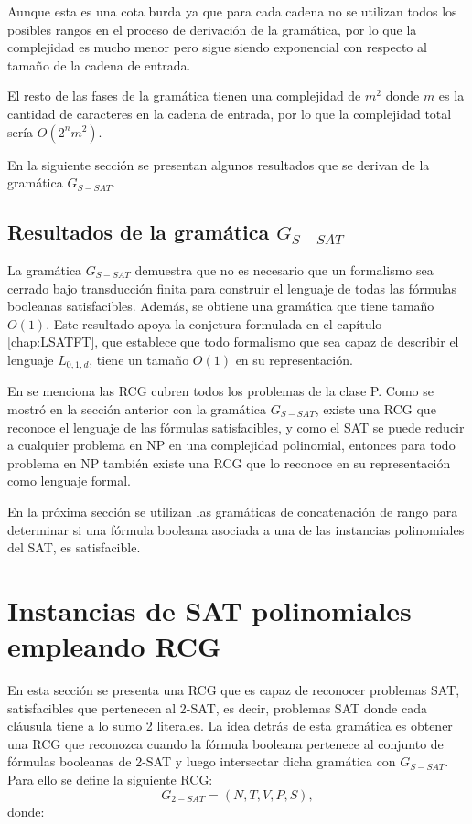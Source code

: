 \documentclass[12pt]{article}
\begin{document}
Aunque esta es una cota burda ya que para cada cadena no se utilizan todos los posibles rangos en el proceso 
de derivación de la gramática, por lo que la complejidad es mucho menor pero sigue siendo exponencial con 
respecto al tamaño de la cadena de entrada.

El resto de las fases de la gramática tienen una complejidad de $m^2$ donde $m$
es la cantidad de caracteres en la cadena de entrada, por lo que la complejidad total sería $O(2^nm^2)$.

En la siguiente sección se presentan algunos resultados que se derivan de la gramática $G_{S-SAT}$.

\subsection{Resultados de la gramática $G_{S-SAT}$}

La gramática $G_{S-SAT}$ demuestra que no es necesario que un formalismo sea cerrado bajo transducción finita 
para construir el lenguaje de todas las fórmulas booleanas satisfacibles. Además, se obtiene una gramática 
que tiene tamaño $O(1)$. Este resultado apoya la conjetura formulada en el capítulo \ref{chap:LSATFT}, que establece
que todo formalismo que sea capaz de describir el lenguaje $L_{0,1,d}$, tiene un tamaño $O(1)$ en su representación.

En \cite{propertiesRCGBib2} se menciona las RCG cubren todos los problemas de la clase P. Como se mostró en la sección 
anterior con la gramática $G_{S-SAT}$, existe una RCG que reconoce el lenguaje de las fórmulas satisfacibles, 
y como el SAT se puede reducir a cualquier problema en NP en una complejidad polinomial, entonces para todo 
problema en NP también existe una RCG que lo reconoce en su representación como lenguaje formal. 

En la próxima sección se utilizan las gramáticas de concatenación de rango para determinar si una fórmula booleana
asociada a una de las instancias polinomiales del SAT, es satisfacible.

\section{Instancias de SAT polinomiales empleando RCG}
\label{sec:pSATRCG}

En esta sección se presenta una RCG que es capaz de reconocer problemas SAT, satisfacibles que pertenecen al 2-SAT, es decir, problemas SAT donde cada cláusula tiene a lo sumo 2 literales. La idea detrás de esta gramática es obtener una RCG que reconozca cuando la fórmula booleana pertenece al conjunto de fórmulas booleanas de 2-SAT y luego intersectar dicha gramática con $G_{S-SAT}$.  Para ello se define la siguiente RCG:
\[
    G_{2-SAT} = (N, T, V, P, S),
\]
donde:
\end{document}
